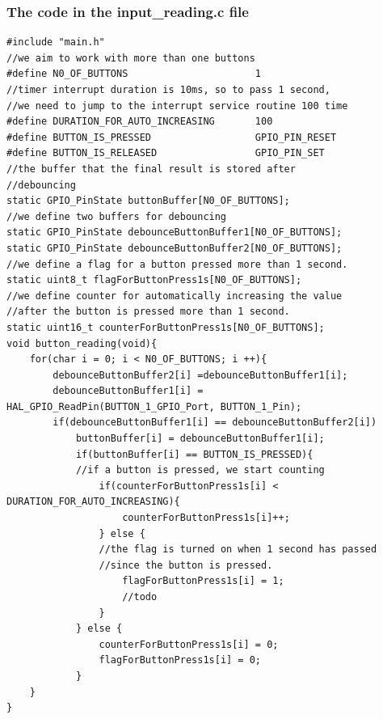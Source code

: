 \subsubsection{The code in the input\_reading.c file}
\begin{lstlisting}[caption=Define constants buffers and button\_reading function]
#include "main.h"
//we aim to work with more than one buttons
#define N0_OF_BUTTONS 				       1
//timer interrupt duration is 10ms, so to pass 1 second, 
//we need to jump to the interrupt service routine 100 time
#define DURATION_FOR_AUTO_INCREASING	   100
#define BUTTON_IS_PRESSED                  GPIO_PIN_RESET
#define BUTTON_IS_RELEASED                 GPIO_PIN_SET
//the buffer that the final result is stored after 
//debouncing
static GPIO_PinState buttonBuffer[N0_OF_BUTTONS];
//we define two buffers for debouncing
static GPIO_PinState debounceButtonBuffer1[N0_OF_BUTTONS];
static GPIO_PinState debounceButtonBuffer2[N0_OF_BUTTONS];
//we define a flag for a button pressed more than 1 second.
static uint8_t flagForButtonPress1s[N0_OF_BUTTONS];
//we define counter for automatically increasing the value 
//after the button is pressed more than 1 second.
static uint16_t counterForButtonPress1s[N0_OF_BUTTONS];
void button_reading(void){
	for(char i = 0; i < N0_OF_BUTTONS; i ++){
		debounceButtonBuffer2[i] =debounceButtonBuffer1[i];
		debounceButtonBuffer1[i] = HAL_GPIO_ReadPin(BUTTON_1_GPIO_Port, BUTTON_1_Pin);
		if(debounceButtonBuffer1[i] == debounceButtonBuffer2[i])
			buttonBuffer[i] = debounceButtonBuffer1[i];
			if(buttonBuffer[i] == BUTTON_IS_PRESSED){
			//if a button is pressed, we start counting
				if(counterForButtonPress1s[i] < DURATION_FOR_AUTO_INCREASING){
					counterForButtonPress1s[i]++;
				} else {
				//the flag is turned on when 1 second has passed 
				//since the button is pressed.
					flagForButtonPress1s[i] = 1;
					//todo
				}
			} else {
				counterForButtonPress1s[i] = 0;
				flagForButtonPress1s[i] = 0;
			}
	}
}
\end{lstlisting}


